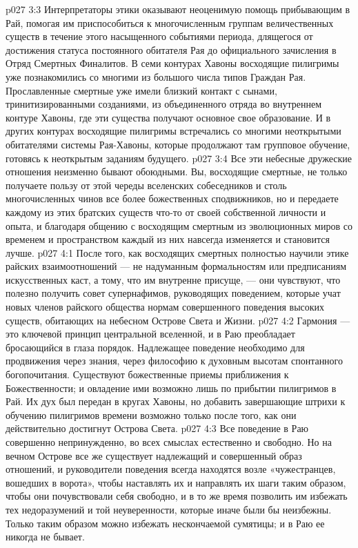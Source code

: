 \vs p027 3:3 Интерпретаторы этики оказывают неоценимую помощь прибывающим в Рай, помогая им приспособиться к многочисленным группам величественных существ в течение этого насыщенного событиями периода, длящегося от достижения статуса постоянного обитателя Рая до официального зачисления в Отряд Смертных Финалитов. В семи контурах Хавоны восходящие пилигримы уже познакомились со многими из большого числа типов Граждан Рая. Прославленные смертные уже имели близкий контакт с сынами, тринитизированными созданиями, из объединенного отряда во внутреннем контуре Хавоны, где эти существа получают основное свое образование. И в других контурах восходящие пилигримы встречались со многими неоткрытыми обитателями системы Рая\hyp{}Хавоны, которые продолжают там групповое обучение, готовясь к неоткрытым заданиям будущего.
\vs p027 3:4 Все эти небесные дружеские отношения неизменно бывают обоюдными. Вы, восходящие смертные, не только получаете пользу от этой череды вселенских собеседников и столь многочисленных чинов все более божественных сподвижников, но и передаете каждому из этих братских существ что\hyp{}то от своей собственной личности и опыта, и благодаря общению с восходящим смертным из эволюционных миров со временем и пространством каждый из них навсегда изменяется и становится лучше.
\vs p027 4:1 После того, как восходящих смертных полностью научили этике райских взаимоотношений --- не надуманным формальностям или предписаниям искусственных каст, а тому, что им внутренне присуще, --- они чувствуют, что полезно получить совет супернафимов, руководящих поведением, которые учат новых членов райского общества нормам совершенного поведения высоких существ, обитающих на небесном Острове Света и Жизни.
\vs p027 4:2 Гармония --- это ключевой принцип центральной вселенной, и в Раю преобладает бросающийся в глаза порядок. Надлежащее поведение необходимо для продвижения через знания, через философию к духовным высотам спонтанного богопочитания. Существуют божественные приемы приближения к Божественности; и овладение ими возможно лишь по прибытии пилигримов в Рай. Их дух был передан в кругах Хавоны, но добавить завершающие штрихи к обучению пилигримов времени возможно только после того, как они действительно достигнут Острова Света.
\vs p027 4:3 Все поведение в Раю совершенно непринужденно, во всех смыслах естественно и свободно. Но на вечном Острове все же существует надлежащий и совершенный образ отношений, и руководители поведения всегда находятся возле «чужестранцев, вошедших в ворота», чтобы наставлять их и направлять их шаги таким образом, чтобы они почувствовали себя свободно, и в то же время позволить им избежать тех недоразумений и той неуверенности, которые иначе были бы неизбежны. Только таким образом можно избежать нескончаемой сумятицы; и в Раю ее никогда не бывает.

